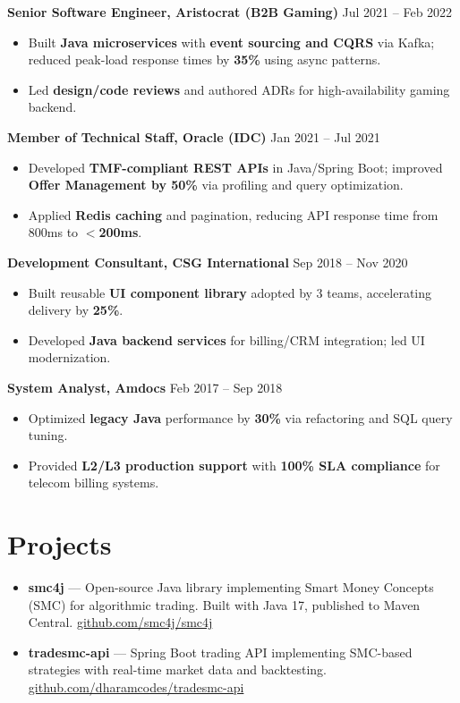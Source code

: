 \documentclass[11pt,a4paper]{article}
\begin{document}
\textbf{Senior Software Engineer, Aristocrat (B2B Gaming)} \hfill Jul 2021 -- Feb 2022
\begin{itemize}
  \item Built \textbf{Java microservices} with \textbf{event sourcing and CQRS} via Kafka; reduced peak-load response times by \textbf{35\%} using async patterns.
  \item Led \textbf{design/code reviews} and authored ADRs for high-availability gaming backend.
\end{itemize}

\textbf{Member of Technical Staff, Oracle (IDC)} \hfill Jan 2021 -- Jul 2021
\begin{itemize}
  \item Developed \textbf{TMF-compliant REST APIs} in Java/Spring Boot; improved \textbf{Offer Management by 50\%} via profiling and query optimization.
  \item Applied \textbf{Redis caching} and pagination, reducing API response time from 800ms to \textbf{$<$200ms}.
\end{itemize}

\textbf{Development Consultant, CSG International} \hfill Sep 2018 -- Nov 2020
\begin{itemize}
  \item Built reusable \textbf{UI component library} adopted by 3 teams, accelerating delivery by \textbf{25\%}.
  \item Developed \textbf{Java backend services} for billing/CRM integration; led UI modernization.
\end{itemize}

\textbf{System Analyst, Amdocs} \hfill Feb 2017 -- Sep 2018
\begin{itemize}
  \item Optimized \textbf{legacy Java} performance by \textbf{30\%} via refactoring and SQL query tuning.
  \item Provided \textbf{L2/L3 production support} with \textbf{100\% SLA compliance} for telecom billing systems.
\end{itemize}

\section{Projects}
\begin{itemize}
  \item \textbf{smc4j} --- Open-source Java library implementing Smart Money Concepts (SMC) for algorithmic trading. Built with Java 17, published to Maven Central. \href{https://github.com/smc4j/smc4j}{github.com/smc4j/smc4j}
  \item \textbf{tradesmc-api} --- Spring Boot trading API implementing SMC-based strategies with real-time market data and backtesting. \href{https://github.com/dharamcodes/tradesmc-api}{github.com/dharamcodes/tradesmc-api}
\end{itemize}
\end{document}
